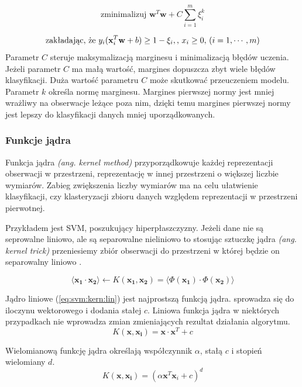 \documentclass[a4paper,12pt,twoside,openany]{report}
\newcommand{\ang}[1]{\textit{(ang. #1)}}
\newcommand{\Eq}[1]{(\ref{#1})}
\renewcommand{\vec}[1]{\bm{#1}}
\begin{document}
\begin{equation}
\mbox{zminimalizuj } {\vec w}^T {\vec w}+C\sum_{i=1}^m \xi_i^k
\end{equation}

\begin{equation}
	\mbox{zakładając, że }  y_i ({\bf x}_i^T {\bf w}+b) \ge 1-\xi_i,
	\mbox{, }x_i \ge 0 \mbox{, }(i=1,\cdots,m)
\end{equation}
Parametr $C$ steruje maksymalizacją marginesu i minimalizacją błędów uczenia.
Jeżeli parametr $C$ ma małą wartość, margines dopuszcza zbyt wiele błędów klasyfikacji.
Duża wartość parametru $C$ może skutkować przeuczeniem modelu.
Parametr $k$ określa normę marginesu. 
Margines pierwszej normy jest mniej wrażliwy na obserwacje leżące poza nim,
dzięki temu margines pierwszej normy jest lepszy do klasyfikacji danych mniej uporządkowanych.

\subsubsection{Funkcje jądra}
Funkcja jądra \ang{kernel method} 
przyporządkowuje każdej reprezentacji obserwacji w przestrzeni,
reprezentację w innej przestrzeni o większej liczbie wymiarów.
Zabieg zwiększenia liczby wymiarów ma na celu ułatwienie 
klasyfikacji, czy klasteryzacji zbioru danych względem
reprezentacji w przestrzeni pierwotnej. 

Przykładem jest SVM, poszukujący hiperpłaszczyzny.
Jeżeli dane nie są seprowalne liniowo,
ale są separowalne nieliniowo to stosując sztuczkę jądra \ang{kernel trick} 
przeniesiemy zbiór obserwacji do przestrzeni w której będzie on separowalny liniowo \cite{Patle2013}.

\begin{equation}
	\langle \vec{x_1} \cdot \vec{x_2} \rangle \gets K(\vec{x_1}, \vec{x_2}) = \langle \Phi(\vec{x_1}) \cdot \Phi(\vec{x_2}) \rangle
\end{equation}

Jądro liniowe \Eq{eq:svm:kern:lin} jest najprostszą funkcją jądra. 
sprowadza się do iloczynu wektorowego i dodania stałej $c$.
Liniowa funkcja jądra w niektórych przypadkach nie wprowadza zmian zmieniających rezultat działania algorytmu.
\begin{equation}
	\label{eq:svm:kern:lin}
	K(\vec x, \vec{x_i}) = \vec x \cdot \vec x ^ T + c
\end{equation}

Wielomianową funkcję jądra określają współczynnik $\alpha$, stałą $c$ i stopień wielomiany $d$.
\begin{equation}
	\label{eq:svm:kern:poly}
	K(\vec x, \vec{x_i}) = (\alpha \vec x^T \vec x_i + c)^d 
\end{equation}
\end{document}
